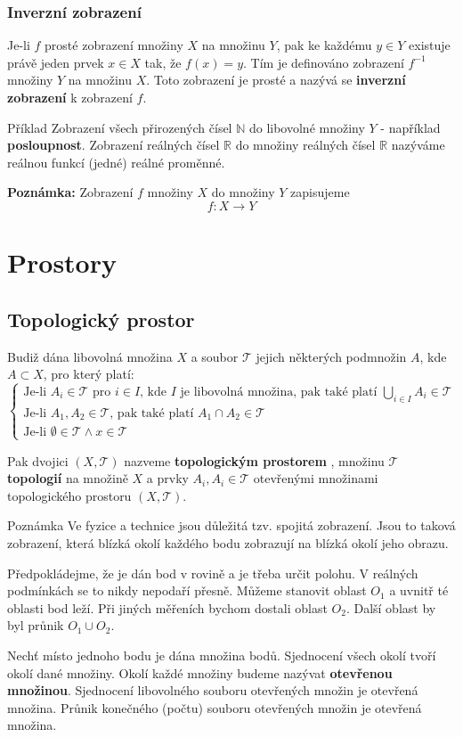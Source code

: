 	\subsubsection{Inverzní zobrazení}
	Je-li $f$ prosté zobrazení množiny $X$ na množinu $Y$, pak ke každému $y\in Y$ existuje právě jeden prvek $x\in X$ tak, že $f(x) = y$. Tím je definováno zobrazení $f^{-1}$ množiny $Y$ na množinu $X$. Toto zobrazení je prosté a nazývá se \textbf{inverzní zobrazení} k zobrazení $f$.
	
	\begin{note}{Příklad}
	Zobrazení všech přirozených čísel $\mathbb{N}$ do libovolné množiny $Y$ - například \textbf{posloupnost}. Zobrazení reálných čísel $\mathbb{R}$ do množiny reálných čísel $\mathbb{R}$ nazýváme reálnou funkcí (jedné) reálné proměnné.\br
	
	\textbf{Poznámka: } Zobrazení $f$ množiny $X$ do množiny $Y$ zapisujeme
	\[ f: X\to Y \]
	\end{note}
	
	\section{Prostory}
	\subsection{Topologický prostor}
	Budiž dána libovolná množina $X$ a soubor $\mathscr{T}$ jejich některých podmnožin $A$, kde $A\subset X$, pro který platí:
	\[ \begin{cases}\text{Je-li } A_i\in\mathscr{T} \text{ pro } i\in I\text{, kde $I$ je libovolná množina, pak také platí }\displaystyle\bigcup_{i\in I}A_i\in\mathscr{T} \\
	\text{Je-li } A_1,A_2\in\mathscr{T}\text{, pak také platí } A_1\cap A_2\in\mathscr{T}\\
	\text{Je-li } \emptyset\in\mathscr{T} \wedge x\in\mathscr{T}
	\end{cases}
	\]
	
	Pak dvojici $(X,\mathscr{T})$ nazveme \textbf{topologickým prostorem }, množinu $\mathscr{T}$ \textbf{topologií} na množině $X$ a prvky $A_i,A_i\in\mathscr{T}$ otevřenými množinami topologického prostoru $(X,\mathscr{T})$.
	
	\begin{note}{Poznámka}
	Ve fyzice a technice jsou důležitá tzv. spojitá zobrazení. Jsou to taková zobrazení, která blízká okolí každého bodu zobrazují na blízká okolí jeho obrazu.\br
	
	Předpokládejme, že je dán bod v rovině a je třeba určit polohu. V reálných podmínkách se to nikdy nepodaří přesně. Můžeme stanovit oblast $O_1$ a uvnitř té oblasti bod leží. Při jiných měřeních bychom dostali oblast $O_2$. Další oblast by byl průnik $O_1\cup O_2$.\br
	
	Nechť místo jednoho bodu je dána množina bodů. Sjednocení všech okolí tvoří okolí dané množiny. Okolí každé množiny budeme nazývat \textbf{otevřenou množinou}. Sjednocení libovolného souboru otevřených množin je otevřená množina. Průnik konečného (počtu) souboru otevřených množin je otevřená množina. 
	\end{note}
	
